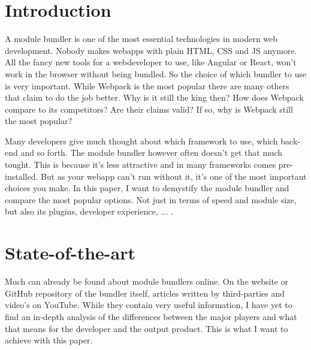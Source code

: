 
\section{Introduction} %
\label{sec:introductie}

A module bundler is one of the most essential technologies in modern web development. Nobody makes webapps with plain HTML, CSS and JS anymore. All the fancy new tools for a webdeveloper to use, like Angular or React, won't work in the browser without being bundled. So the choice of which bundler to use is very important.
While Webpack is the most popular there are many others that claim to do the job better. Why is it still the king then? How does Webpack compare to its competitors? Are their claims valid? If so, why is Webpack still the most popular? 

Many developers give much thought about which framework to use, which back-end and so forth. The module bundler however often doesn't get that much tought. This is because it's less attractive and in many frameworks comes pre-installed. But as your webapp can't run without it, it's one of the most important choices you make. In this paper, I want to demystify the module bundler and compare the most popular options. Not just in terms of speed and module size, but also its plugins, developer experience, ... .



\section{State-of-the-art}
\label{sec:state-of-the-art}

Much can already be found about module bundlers online. On the website or GitHub repository of the bundler itself, articles written by third-parties and video's on YouTube. While they contain very useful information, I have yet to find an in-depth analysis of the differences between the major players and what that means for the developer and the output product. This is what I want to achieve with this paper. 


